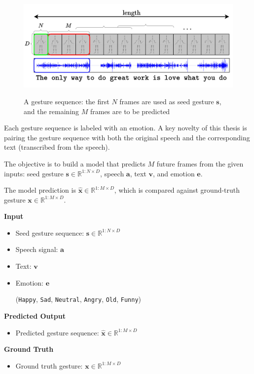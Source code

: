 \begin{figure}[h]
	\centering
	\href{https://www.youtube.com/watch?v=B6nv1kQmi-Q}{\includegraphics[width=\linewidth]{images/FeatureProcessing}}
	\caption{A gesture sequence: the first $N$ frames are used as seed gesture $\mathbf{s}$, and the remaining $M$ frames are to be predicted}
	\label{fig:GestureSeries}
\end{figure}

Each gesture sequence is labeled with an emotion. A key novelty of this thesis is pairing the gesture sequence with both the original speech and the corresponding text (transcribed from the speech).

The objective is to build a model that predicts $M$ future frames from the given inputs: seed gesture $\mathbf{s} \in \mathbb{R}^{1:N \times D}$, speech $\mathbf{a}$, text $\mathbf{v}$, and emotion $\mathbf{e}$.

The model prediction is $\hat{\mathbf{x}} \in \mathbb{R}^{1:M \times D}$, which is compared against ground-truth gesture $\mathbf{x} \in \mathbb{R}^{1:M \times D}$.

\begin{multicols}{2}
	
	\textbf{Input}
	
	\begin{itemize}
		\item Seed gesture sequence: $\mathbf{s} \in \mathbb{R}^{1:N \times D}$
		\item Speech signal: $\mathbf{a}$
		\item Text: $\mathbf{v}$
		\item Emotion: $\mathbf{e}$ 
		
		{\small
			(\texttt{Happy},  \texttt{Sad},  \texttt{Neutral}, \texttt{Angry}, \texttt{Old}, \texttt{Funny})
		}
	\end{itemize}
	
	\columnbreak
	
	\textbf{Predicted Output}
	\begin{itemize}
		\item Predicted gesture sequence:
		$\hat{\mathbf{x}} \in \mathbb{R}^{1:M \times D}$
	\end{itemize}
	
	\textbf{Ground Truth}
	\begin{itemize}
		\item Ground truth gesture: $ \mathbf{x}  \in \mathbb{R}^{1:M \times D}$
	\end{itemize}
	
\end{multicols}

